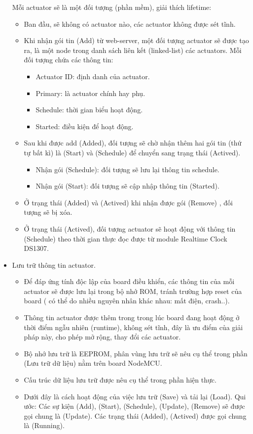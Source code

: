 \documentclass[a4paper,12pt,oneside]{article}
\begin{document}
\begin{itemize}
\noindent Mỗi actuator sẽ là một đối tượng (phần mềm), giải thích lifetime:
	\begin{itemize}
	\item Ban đầu, sẽ không có actuator nào, các actuator không được sét tĩnh.
	\item  Khi nhận gói tin (Add) từ web-server, một đối tượng actuator sẽ được tạo ra, là một node trong danh sách liên kết (linked-list) các actuators. Mỗi đối tượng chứa các thông tin:
\begin{itemize}
\item Actuator ID: định danh của actuator.
\item Primary: là actuator chính hay phụ.
\item Schedule: thời gian biểu hoạt động.
\item Started: điều kiện để hoạt động.
\end{itemize}

	\item Sau khi được add (Added), đối tượng sẽ chờ nhận thêm hai gói tin (thứ tự bất kì) là (Start) và (Schedule) để chuyển sang trạng thái (Actived).
		\begin{itemize}
			\item Nhận gói (Schedule): đối tượng sẽ lưu lại thông tin schedule.
			\item Nhận gói (Start): đối tượng sẽ cập nhập thông tin (Started). 
		\end{itemize}			

	\item Ở trạng thái (Added) và (Actived) khi nhận được gói (Remove) , đối tượng sẽ bị xóa.
	\item Ở trạng thái (Actived), đối tượng actuator sẽ hoạt động với thông tin (Schedule) theo thời gian thực đọc được từ module Realtime Clock DS1307.
	\end{itemize}
\item Lưu trữ thông tin actuator.

	\begin{itemize}
	\item Để đáp ứng tính độc lập của board điều khiển, các thông tin của mỗi actuator sẽ được lưu lại trong bộ nhớ ROM, tránh trường hợp reset của board ( có thể do nhiều nguyên nhân khác nhau: mất điện, crash..).
	\item Thông tin actuator được thêm trong trong lúc board đang hoạt động ở thời điểm ngẫu nhiên (runtime), không sét tĩnh, đây là ưu điểm của giải pháp này, cho phép mở rộng, thay đổi các actuator.
	\item Bộ nhớ lưu trữ là EEPROM, phân vùng lưu trữ sẽ nêu cụ thể trong phần (Lưu trữ dữ liệu) nằm trên board NodeMCU.
	\item Cấu trúc dữ liệu lưu trữ được nêu cụ thể trong phần hiện thực.
	\item Dưới đây là cách hoạt động của việc lưu trữ (Save) và tải lại (Load). Qui ước: Các sự kiện (Add), (Start), (Schedule), (Update), (Remove) sẽ được gọi chung là (Update). Các trạng thái (Added), (Actived) được gọi chung là (Running).\\\\
	

\end{itemize}
\end{itemize}
\end{document}
